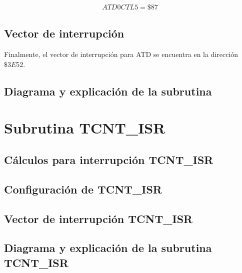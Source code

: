 \documentclass[12pt,letterpaper]{report} %
\begin{document}
\begin{align*}
    ATD0CTL5 = \$87
\end{align*} 

\subsection{Vector de interrupción \subname}

Finalmente, el vector de interrupción para ATD se encuentra en la dirección $\$3E52$.


\subsection{Diagrama y explicación de la subrutina \subname}

\renewcommand{\subname}{TCNT\_ISR}


\section{Subrutina \subname}
\subsection{Cálculos para interrupción \subname}
\subsection{Configuración de \subname}
\subsection{Vector de interrupción \subname}
\subsection{Diagrama y explicación de la subrutina \subname}

\end{document}
